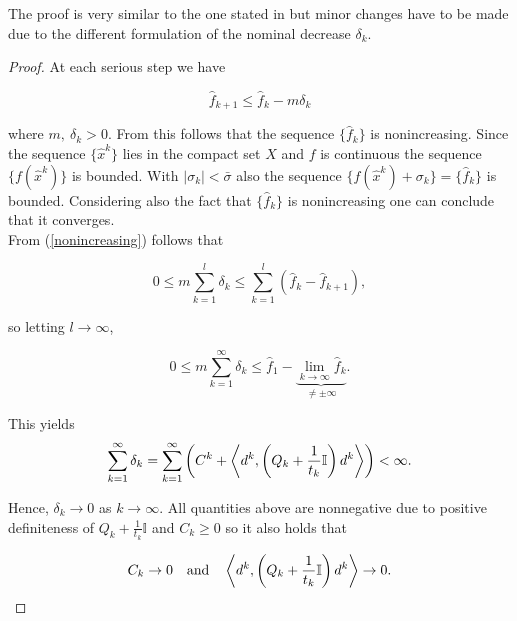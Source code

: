 The proof is very similar to the one stated in \cite{Hare2016} but minor changes have to be made due to the different formulation of the nominal decrease \(\delta_k\).

\begin{proof}
	At each serious step we have
	
	\begin{equation}
		\hat{f}_{k+1} \leq \hat{f}_k - m\delta_k
	\label{nonincreasing}
	\end{equation}
	
	where \(m, ~\delta_k > 0\). From this follows that the sequence \(\{\hat{f}_k\}\) is nonincreasing.
	Since the sequence \(\{\hat{x}^k\}\) lies in the compact set \(X\) and \(f\) is continuous the sequence \(\{f(\hat{x}^k)\}\) is bounded. %
	With \(|\sigma_k| < \bar{\sigma}\) also the sequence \(\{f(\hat{x}^k)+\sigma_k\} = \{\hat{f}_k\}\) is bounded. Considering also the fact that \(\{\hat{f}_k\}\) is nonincreasing one can conclude that it converges. \\
	From (\ref{nonincreasing}) follows that
	
	\begin{equation*}
		0 \leq m \sum_{k = 1}^l \delta_k \leq \sum_{k = 1}^l \left(\hat{f}_k-\hat{f}_{k+1}\right),
	\end{equation*}
	
	so letting \(l \to \infty\), 
	
	\begin{equation*}
		0 \leq m\sum_{k=1}^{\infty} \delta_k \leq \hat{f}_1 - \underbrace{\lim_{k \to \infty} \hat{f}_k}_{\neq \pm \infty}.
	\end{equation*}
	
	This yields
	\begin{equation*}
		\sum_{k = 1}^{\infty} \delta_k = \sum_{k=1}^{\infty}\left(C^k+\left\langle d^k,\left(Q_k+\frac{1}{t_k}\mathbb{I}\right)d^k\right\rangle \right) < \infty.
	\end{equation*}
	
	Hence, \(\delta_k \to 0\) as \(k \to \infty\). All quantities above are nonnegative due to positive definiteness of \(Q_k+\frac{1}{t_k}\mathbb{I}\) and \(C_k \geq 0\) so it also holds that
	
	\begin{equation*}
		C_k \to 0 \quad \text{and} \quad \left\langle d^k,\left(Q_k+\frac{1}{t_k}\mathbb{I}\right)d^k\right\rangle \to 0.
	\end{equation*}
	

\end{proof}
